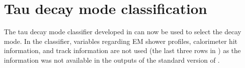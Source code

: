\section{Tau decay mode classification}

The tau decay mode classifier developed in  can now be used to select the \tauToPionBoth decay mode. In the classifier, variables regarding EM shower profiles, calorimeter hit information, and track information are not used (the last three rows in ) as the information was not available in the outputs of the standard version of \pandora.

